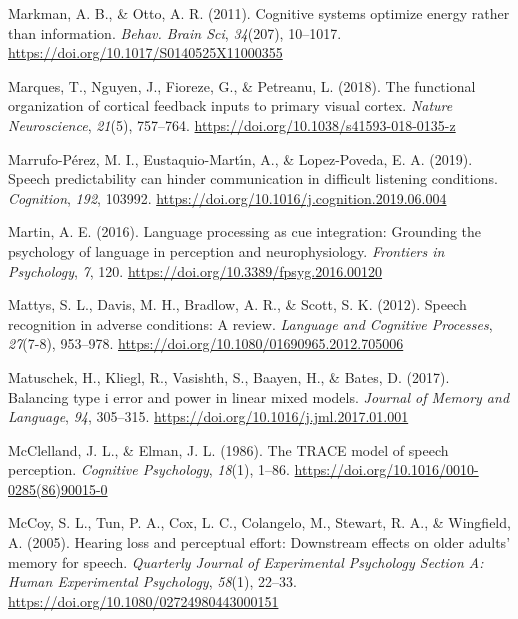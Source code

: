 \documentclass[a4paper, nobind]{templates/ociamthesis}
\newlength{\cslhangindent}
\newenvironment{CSLReferences}[2] %
 {%
  \setlength{\parindent}{0pt}
  \ifodd #1
  \let\oldpar\par
  \def\par{\hangindent=\cslhangindent\oldpar}
  \fi
  \setlength{\parskip}{1mm}
  \setlength{\baselineskip}{6mm}
 }%
 {}
\begin{document}
\begin{CSLReferences}{1}{0}
\leavevmode{}%
Markman, A. B., \& Otto, A. R. (2011). Cognitive systems optimize energy rather than information. \emph{Behav. Brain Sci}, \emph{34}(207), 10--1017. \url{https://doi.org/10.1017/S0140525X11000355}

\leavevmode{}%
Marques, T., Nguyen, J., Fioreze, G., \& Petreanu, L. (2018). The functional organization of cortical feedback inputs to primary visual cortex. \emph{Nature Neuroscience}, \emph{21}(5), 757--764. \url{https://doi.org/10.1038/s41593-018-0135-z}

\leavevmode{}%
Marrufo-Pérez, M. I., Eustaquio-Martı́n, A., \& Lopez-Poveda, E. A. (2019). Speech predictability can hinder communication in difficult listening conditions. \emph{Cognition}, \emph{192}, 103992. \url{https://doi.org/10.1016/j.cognition.2019.06.004}

\leavevmode{}%
Martin, A. E. (2016). Language processing as cue integration: Grounding the psychology of language in perception and neurophysiology. \emph{Frontiers in Psychology}, \emph{7}, 120. \url{https://doi.org/10.3389/fpsyg.2016.00120}

\leavevmode{}%
Mattys, S. L., Davis, M. H., Bradlow, A. R., \& Scott, S. K. (2012). {Speech recognition in adverse conditions: A review}. \emph{Language and Cognitive Processes}, \emph{27}(7-8), 953--978. \url{https://doi.org/10.1080/01690965.2012.705006}

\leavevmode{}%
Matuschek, H., Kliegl, R., Vasishth, S., Baayen, H., \& Bates, D. (2017). Balancing type i error and power in linear mixed models. \emph{Journal of Memory and Language}, \emph{94}, 305--315. \url{https://doi.org/10.1016/j.jml.2017.01.001}

\leavevmode{}%
McClelland, J. L., \& Elman, J. L. (1986). {The TRACE model of speech perception}. \emph{Cognitive Psychology}, \emph{18}(1), 1--86. \url{https://doi.org/10.1016/0010-0285(86)90015-0}

\leavevmode{}%
McCoy, S. L., Tun, P. A., Cox, L. C., Colangelo, M., Stewart, R. A., \& Wingfield, A. (2005). {Hearing loss and perceptual effort: Downstream effects on older adults' memory for speech}. \emph{Quarterly Journal of Experimental Psychology Section A: Human Experimental Psychology}, \emph{58}(1), 22--33. \url{https://doi.org/10.1080/02724980443000151}


\end{CSLReferences}
\end{document}
